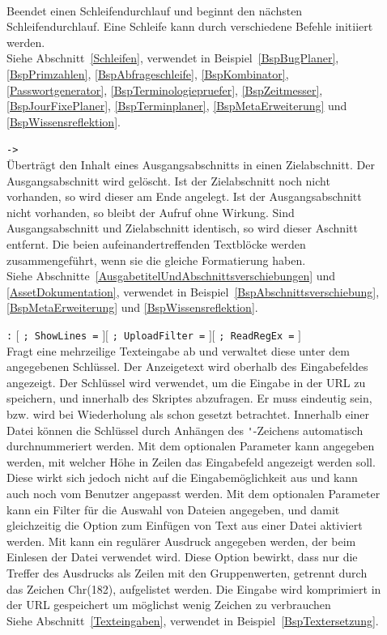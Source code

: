 \begin{description}
\item[]\mbox{}\\
Beendet einen Schleifendurchlauf und beginnt den nächsten Schleifendurchlauf. Eine Schleife kann durch verschiedene Befehle initiiert werden.\\
Siehe Abschnitt~\ref{Schleifen}, verwendet in Beispiel~\ref{BspBugPlaner}, \ref{BspPrimzahlen}, \ref{BspAbfrageschleife}, \ref{BspKombinator}, \ref{Passwortgenerator}, \ref{BspTerminologiepruefer}, \ref{BspZeitmesser}, \ref{BspJourFixePlaner}, \ref{BspTerminplaner}, \ref{BspMetaErweiterung} und \ref{BspWissensreflektion}.

\item[]  \verb|->| \\
Überträgt den Inhalt eines Ausgangsabschnitts in einen Zielabschnitt. Der Ausgangsabschnitt wird gelöscht.
Ist der Zielabschnitt noch nicht vorhanden, so wird dieser am Ende angelegt. Ist der Ausgangsabschnitt nicht vorhanden, so bleibt der Aufruf ohne Wirkung. Sind Ausgangsabschnitt und Zielabschnitt identisch, so wird dieser Aschnitt entfernt. Die beien aufeinandertreffenden Textblöcke werden zusammengeführt, wenn sie die gleiche Formatierung haben.\\
Siehe Abschnitte~\ref{AusgabetitelUndAbschnittsverschiebungen} und \ref{AssetDokumentation}, verwendet in Beispiel~\ref{BspAbschnittsverschiebung}, \ref{BspMetaErweiterung} und \ref{BspWissensreflektion}.

\item[]  \verb|:|  $[$ \verb|; ShowLines =|  $][$ \verb|; UploadFilter =|  $][$ \verb|; ReadRegEx =|  $]$\\
Fragt eine mehrzeilige Texteingabe ab und verwaltet diese unter dem angegebenen Schlüssel. Der Anzeigetext wird oberhalb des Eingabefeldes angezeigt.
Der Schlüssel wird verwendet, um die Eingabe in der URL zu speichern, und innerhalb des Skriptes abzufragen. Er muss eindeutig sein, bzw. wird bei Wiederholung als schon gesetzt betrachtet. Innerhalb einer Datei können die Schlüssel durch Anhängen des \verb|'|-Zeichens automatisch durchnummeriert werden. Mit dem optionalen Parameter  kann angegeben werden, mit welcher Höhe in Zeilen das Eingabefeld angezeigt werden soll. Diese wirkt sich jedoch nicht auf die Eingabemöglichkeit aus und kann auch noch vom Benutzer angepasst werden. Mit dem optionalen Parameter  kann ein Filter für die Auswahl von Dateien angegeben, und damit gleichzeitig die Option zum Einfügen von Text aus einer Datei aktiviert werden. Mit  kann ein regulärer Ausdruck angegeben werden, der beim Einlesen der Datei verwendet wird. Diese Option bewirkt, dass nur die Treffer des Ausdrucks als Zeilen mit den Gruppenwerten, getrennt durch das Zeichen Chr(182), aufgelistet werden. 
Die Eingabe wird komprimiert in der URL gespeichert um möglichst wenig Zeichen zu verbrauchen\\
Siehe Abschnitt~\ref{Texteingaben}, verwendet in Beispiel~\ref{BspTextersetzung}.


\end{description}
